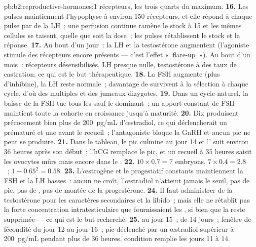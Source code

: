\begin{solution}{pb:b2:reproductive-hormones:1}
récepteurs, les trois quarts du maximum.
\textbf{16.} Les pulses maintiennent l'hypophyse à environ 150
récepteurs, et elle répond à chaque pulse par de la LH~; une perfusion
continue ramène le stock à 15 et les mêmes cellules se taisent, quelle
que soit la dose~; les pulses rétablissent le stock et la réponse.
\textbf{17.} Au bout d'un jour~: la LH et la testostérone augmentent
(l'agoniste stimule des récepteurs encore présents --- c'est l'effet
«~flare-up~»). Au bout d'un mois~: récepteurs désensibilisés, LH presque
nulle, testostérone à des taux de castration, ce qui est le but
thérapeutique.
\textbf{18.} La FSH augmente (plus d'inhibine), la LH reste normale~;
davantage de  survivent à la sélection à chaque cycle, d'où
des  multiples et des jumeaux dizygotes.
\textbf{19.} Dans un cycle naturel, la baisse de la FSH tue tous les
 sauf le dominant~; un apport constant de FSH maintient toute
la cohorte en croissance jusqu'à maturité.
\textbf{20.} Dix  produisent précocement bien plus de
\qty{200}{pg/mL} d'œstradiol, ce qui déclencherait un 
prématuré et une  avant le recueil~; l'antagoniste bloque la
GnRH et aucun pic ne peut se produire.
\textbf{21.} Dans le tableau, le pic culmine au jour 14 et l'
suit environ 36 heures après son début~; l'hCG remplace le pic, et un
recueil à 35 heures saisit les ovocytes mûrs mais encore dans le
.
\textbf{22.} $10\times 0.7 = 7$ embryons, $7\times 0.4 = 2.8$
~; $1 - 0.65^{2} = 0.58$.
\textbf{23.} L'œstrogène et le progestatif constants maintiennent la FSH
et la LH basses~: aucun  ne croît, l'œstradiol n'atteint jamais
le seuil, pas de pic, pas de , pas de montée de la
progestérone.
\textbf{24.} Il faut administrer de la testostérone pour les caractères
secondaires et la libido~; mais elle ne rétablit pas la forte
concentration intratesticulaire que fournissaient les , si bien que la  reste supprimée --- ce qui est le
but recherché.
\textbf{25.}  au jour 15~;  de 14 jours~; fenêtre
de fécondité du jour 12 au jour 16~; pic déclenché par un œstradiol
supérieur à \qty{200}{pg/mL} pendant plus de 36 heures, condition
remplie les jours 11 à 14.
\end{solution}
